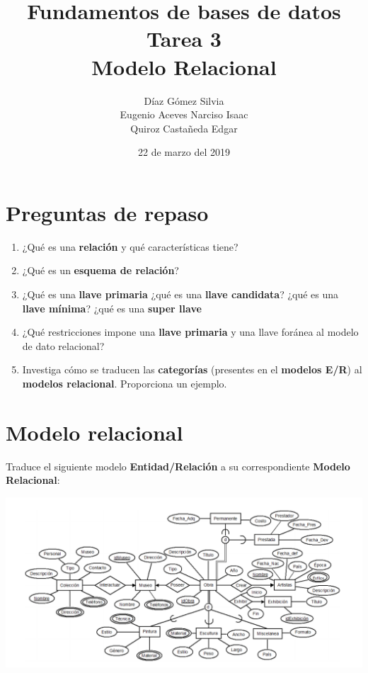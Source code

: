 \documentclass{article}
\begin{document}
    \title{
        Fundamentos de bases de datos \\
        Tarea 3 \\
        Modelo Relacional
    }
    \author{
        Díaz Gómez Silvia \\
        Eugenio Aceves Narciso Isaac \\
        Quiroz Castañeda Edgar
    }
    \date {
        22 de marzo del 2019    
    }
    \maketitle

    \section{Preguntas de repaso}
    \begin{enumerate}[label = \alph*.]
        \item ¿Qué es una \textbf{relación} y qué características tiene?
        \item ¿Qué es un \textbf{esquema de relación}?
        \item ¿Qué es una \textbf{llave primaria} ¿qué es una \textbf{llave 
        candidata}? ¿qué es una \textbf{llave mínima}? ¿qué es una \textbf{super
        llave}
        \item ¿Qué restricciones impone una \textbf{llave primaria} y una llave 
        foránea al modelo de dato relacional?
        \item Investiga cómo se traducen las \textbf{categorías} (presentes en
        el \textbf{modelos E/R}) al \textbf{modelos relacional}. Proporciona un 
        ejemplo.
    \end{enumerate}

    \section{Modelo relacional}
    Traduce el siguiente modelo \textbf{Entidad/Relación} a su correspondiente 
    \textbf{Modelo Relacional}:
    
    \begin{center}
        \includegraphics[width=1\textwidth]{er1.png}
    \end{center}
\end{document}
